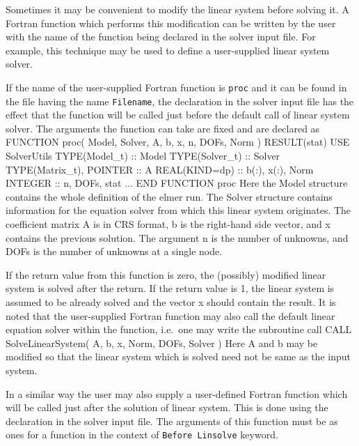 \begin{versiona}
Sometimes it may be convenient to modify the linear system 
before solving it. A Fortran function which performs this modification can be
written by the user with the name of the function being declared in the solver 
input file. For example, this technique may be used to define a user-supplied 
linear system solver. 

If the name of the user-supplied Fortran function is {\tt proc} and it 
can be found in the file having the name {\tt Filename}, the declaration
\sifbegin
{}
\sifend
in the solver input file has the effect that the function will be called just
before the default call of linear system solver.
The arguments the function can take are fixed and are declared as  
\ttbegin
   FUNCTION proc( Model, Solver, A,  b, x, n, DOFs, Norm ) RESULT(stat)
      USE SolverUtils
      TYPE(Model_t)  :: Model
      TYPE(Solver_t) :: Solver
      TYPE(Matrix_t), POINTER :: A
      REAL(KIND=dp) :: b(:), x(:), Norm
      INTEGER :: n, DOFs, stat 
      ...
   END FUNCTION proc
\ttend
Here the Model structure contains the whole definition of the elmer run. The Solver structure
contains information for the equation solver from which this linear system originates. 
The coefficient matrix A is in CRS format, b is the right-hand side vector, 
and x contains the previous solution. The argument n is the number of 
unknowns, and DOFs is the number of unknowns at a single node. 

If the return value from this function is zero, the (possibly) modified linear system is solved
after the return. If the return value is 1, the linear system is assumed to be already solved
and the vector x should contain the result. It is noted that the user-supplied Fortran function  
may also call the default linear equation solver within the function, i.e.\ one may write
the subroutine call
\ttbegin
   CALL SolveLinearSystem( A, b, x, Norm, DOFs, Solver )
\ttend
Here A and b may be modified so that the linear system which is solved need not be 
same as the input system.

In a similar way the user may also supply a user-defined Fortran function which
will be called just after the solution of linear system. This is done using the 
declaration
\sifbegin
{}
\sifend
in the solver input file. The arguments of this function must be as ones for a  
function in the context of {\tt Before Linsolve} keyword.




\end{versiona}
